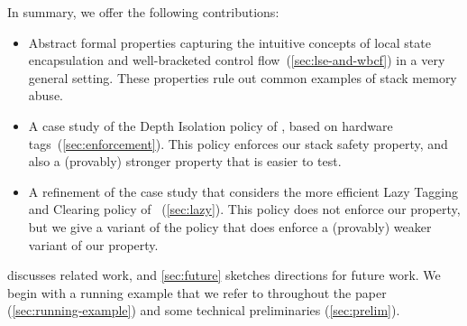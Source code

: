 \documentclass[acmsmall,review,anonymous]{acmart}\settopmatter{printfolios=true,printccs=false,printacmref=false}
\begin{document}
In summary, we offer the following contributions:
\begin{itemize}
\item
  Abstract formal properties capturing the
  intuitive concepts of local state encapsulation and well-bracketed
  control flow~(\cref{sec:lse-and-wbcf}) in a very general setting. These properties
  rule out common examples of stack memory abuse.
\item
  A case study of the Depth Isolation policy of \citet{DBLP:conf/sp/RoesslerD18}, based on hardware tags~(\cref{sec:enforcement}).
  This policy enforces our stack safety property, and also a (provably) stronger property that is easier to test.
   
\item
  A refinement of the case study that considers the more efficient Lazy Tagging and Clearing policy
  of \citet{DBLP:conf/sp/RoesslerD18}~(\cref{sec:lazy}).  This policy does not enforce our property, but we give a
  variant of the policy that does enforce a (provably) weaker variant of our
  property.
%
   

\end{itemize}
 discusses related work, and
\cref{sec:future} sketches directions for future work.
%
We begin with a running example that we refer
to throughout the paper (\cref{sec:running-example}) and some
technical preliminaries (\cref{sec:prelim}).
\end{document}

